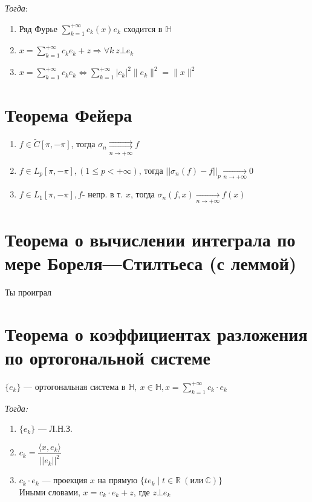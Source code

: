 \documentclass[paper=a4, fontsize=14pt]{article}
\begin{document}
\emph{Тогда}:
\begin{enumerate}
\item Ряд Фурье $\sum\limits_{k=1}^{+\infty} c_k(x) e_k$ сходится в $\mathds{H}$
\item $x =\sum\limits_{k=1}^{+\infty} c_k e_k + z \Rightarrow \forall k \ z \bot e_k$
\item $x =\sum\limits_{k=1}^{+\infty} c_k e_k \Leftrightarrow \sum\limits_{k=1}^{+\infty} \vert c_k \vert^2 \|e_k\|^2=\|x\|^2$
\end{enumerate}

\section{Теорема Фейера}
\begin{enumerate}
\item $ f \in \widetilde{C}[\pi, -\pi] $, тогда $ \sigma_n \underset{n \rightarrow +\infty}{\rightrightarrows} f$

\item $ f \in L_p[\pi, -\pi], (1 \leq p < +\infty)$, тогда $ ||\sigma_n(f) - f||_p \underset{n \rightarrow +\infty}{\rightarrow} 0 $

\item $ f \in L_1[\pi, -\pi], f $- непр. в т. $x$, тогда $ \sigma_n(f, x) \underset{n \rightarrow +\infty}{\rightarrow} f(x) $
\end{enumerate}

\section{Теорема о вычислении интеграла по мере Бореля---Стилтьеса (с леммой)}
Ты проиграл

\section{Теорема о коэффициентах разложения по ортогональной системе}

$\{e_k\}$ {{---}} ортогональная система в $\mathds{H},\ x \in \mathds{H}, x = \sum\limits_{k=1}^{+\infty} c_k \cdot e_k$

\emph{Тогда:}
\begin{enumerate}

\item $\{e_k\}$ {{---}} Л.Н.З.

\item $c_k = \dfrac{\langle x, e_k \rangle}{||e_k||^2}$

\item $c_k \cdot e_k$ {{---}} проекция $x$ на прямую $\{te_k \mid t \in \mathbb{R}\ (\text{или}\ \mathbb{C})\}$\\
Иными словами, $x = c_k \cdot e_k + z$, где $z \bot e_k$

\end{enumerate}
\end{document}
